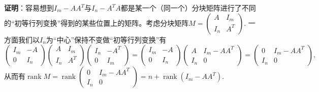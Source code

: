 \ifIncludeAnswer

\newpageorvspace

\textbf{证明}：容易想到$I_m - AA^T$与$I_n - A^TA$都是某一个（同一个）分块矩阵进行了不同的``初等行列变换''得到的某些位置上的矩阵。考虑分块矩阵$M = \begin{pmatrix} A & I_m \\ I_n & A^T \end{pmatrix}.$ 一方面我们以$I_n$为``中心''保持不变做``初等行列变换''有
$$\begin{pmatrix} I_m & -A \\ 0 & I_n \end{pmatrix} \begin{pmatrix} A & I_m \\ I_n & A^T \end{pmatrix} \begin{pmatrix} I_n & -A^T \\ 0 & I_m \end{pmatrix} = \begin{pmatrix} I_m & -A \\ 0 & I_n \end{pmatrix} \begin{pmatrix} A & I_m - AA^T \\ I_n & 0 \end{pmatrix} = \begin{pmatrix} 0 & I_m - AA^T \\ I_n & 0 \end{pmatrix},$$
从而有$\operatorname{rank} M = \operatorname{rank} \begin{pmatrix} 0 & I_m - AA^T \\ I_n & 0 \end{pmatrix} = n + \operatorname{rank} (I_m - AA^T).$

